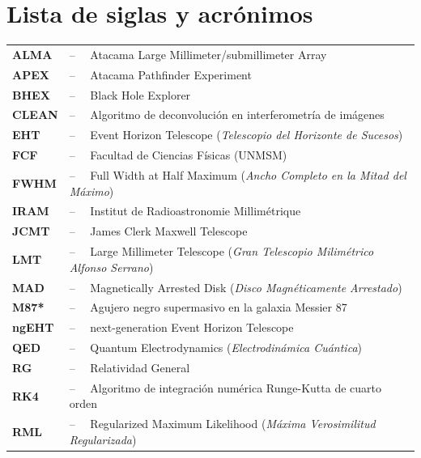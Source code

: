 \chapter*{\hfill{\centering Lista de siglas y acrónimos}\hfill}
\vspace{0.5cm}
\normalsize

\begin{tabular}{p{2.2cm}l}
\textbf{ALMA}   & --$\quad$ Atacama Large Millimeter/submillimeter Array\\
\textbf{APEX}   & --$\quad$ Atacama Pathfinder Experiment\\
\textbf{BHEX}   & --$\quad$ Black Hole Explorer\\
\textbf{CLEAN}  & --$\quad$ Algoritmo de deconvolución en interferometría de imágenes\\
\textbf{EHT}    & --$\quad$ Event Horizon Telescope (\textit{Telescopio del Horizonte de Sucesos})\\
\textbf{FCF}    & --$\quad$ Facultad de Ciencias Físicas (UNMSM)\\
\textbf{FWHM}   & --$\quad$ Full Width at Half Maximum (\textit{Ancho Completo en la Mitad del Máximo})\\
\textbf{IRAM}   & --$\quad$ Institut de Radioastronomie Millimétrique\\
\textbf{JCMT}   & --$\quad$ James Clerk Maxwell Telescope\\
\textbf{LMT}    & --$\quad$ Large Millimeter Telescope (\textit{Gran Telescopio Milimétrico Alfonso Serrano})\\
\textbf{MAD}    & --$\quad$ Magnetically Arrested Disk (\textit{Disco Magnéticamente Arrestado})\\
\textbf{M87*}   & --$\quad$ Agujero negro supermasivo en la galaxia Messier 87\\
\textbf{ngEHT}  & --$\quad$ next-generation Event Horizon Telescope\\
\textbf{QED}    & --$\quad$ Quantum Electrodynamics (\textit{Electrodinámica Cuántica})\\
\textbf{RG}     & --$\quad$ Relatividad General\\
\textbf{RK4}    & --$\quad$ Algoritmo de integración numérica Runge-Kutta de cuarto orden\\
\textbf{RML}    & --$\quad$ Regularized Maximum Likelihood (\textit{Máxima Verosimilitud Regularizada})\\

\end{tabular}
